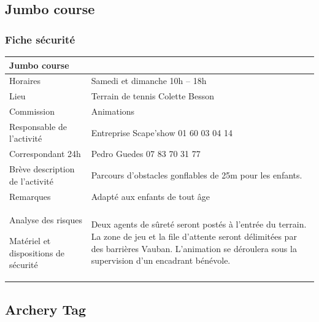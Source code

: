 \documentclass[hidelinks, paper=a4, fontsize=13pt]{report}
\begin{document}
\subsection{Jumbo course}

\subsubsection{Fiche sécurité}
\begin{center}
\begin{tabular}{ | p{6cm} | p{10cm} | }
\hline
	\multicolumn{2}{|l|}{Jumbo course}  \\ \hline
	Horaires & Samedi et dimanche 10h – 18h \\ \hline
	Lieu & Terrain de tennis Colette Besson \\ \hline
	Commission & Animations \\ \hline
	Responsable de l'activité & Entreprise Scape'show 01 60 03 04 14 \\ \hline
	Correspondant 24h & Pedro Guedes 07 83 70 31 77  \\ \hline
	Brève description de l'activité & Parcours d'obstacles gonflables de 25m pour les enfants. \\ \hline
	Remarques & Adapté aux enfants de tout âge\\ \hline
	Analyse des risques
	
Matériel et dispositions de sécurité & Deux agents de sûreté seront postés à l’entrée du terrain. La zone de jeu et la file d'attente seront délimitées par des barrières Vauban. L'animation se déroulera sous la supervision d'un encadrant bénévole. \\ \hline
\end{tabular}

\end{center}

\subsection{Archery Tag}
\end{document}
